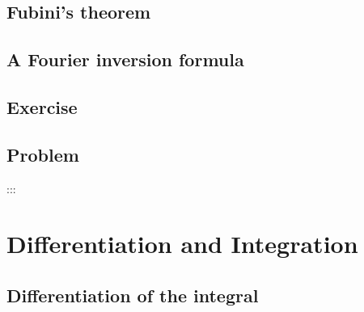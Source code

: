 \documentclass[
]{book}
\theoremstyle{definition}
\theoremstyle{definition}
\theoremstyle{definition}
\theoremstyle{definition}
\theoremstyle{remark}
\begin{document}
\section{Fubini's theorem}\label{fubinis-theorem}

\section{A Fourier inversion formula}\label{a-fourier-inversion-formula}

\section{Exercise}\label{exercise-1}

\section{Problem}\label{problem-1}

:::

\chapter{Differentiation and Integration}\label{ch3}

\section{Differentiation of the integral}\label{differentiation-of-the-integral}

  
\end{document}
